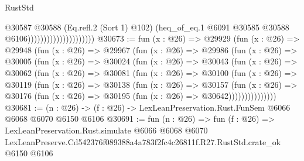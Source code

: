 \begin{lexlean}{RustStd}
\begin{coremodule}
                                          @30587
                                            @30588
                                            (Eq.refl.{2} (Sort 1) @102)
                                            (heq_of_eq.{1}
                                              @6091
                                              @30585
                                              @30588
                                              @6106)))))))))))))))))))))
@30673 := fun (x : @26) =>
  @29929
    (fun (x : @26) =>
    @29948
      (fun (x : @26) =>
      @29967
        (fun (x : @26) =>
        @29986
          (fun (x : @26) =>
          @30005
            (fun (x : @26) =>
            @30024
              (fun (x : @26) =>
              @30043
                (fun (x : @26) =>
                @30062
                  (fun (x : @26) =>
                  @30081
                    (fun (x : @26) =>
                    @30100
                      (fun (x : @26) =>
                      @30119
                        (fun (x : @26) =>
                        @30138
                          (fun (x : @26) =>
                          @30157
                            (fun (x : @26) =>
                            @30176 (fun (x : @26) => @30195 (fun (x : @26) => @30642)))))))))))))))
@30681 := (n : @26) -> (f : @26) -> LexLeanPreservation.Rust.FunSem @6066 @6068 @6070 @6150 @6106
@30691 := fun (n : @26) =>
  fun (f : @26) =>
  LexLeanPreservation.Rust.simulate
    @6066
    @6068
    @6070
    LexLeanPreserve.Cd542376f089388a4a783f2fc4c26811f.R27.RustStd.crate_ok
    @6150
    @6106
\end{coremodule}
\end{lexlean}
